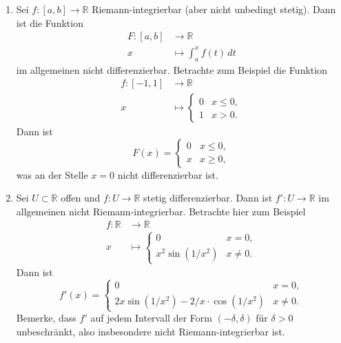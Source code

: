 \documentclass[../main.tex]{subfiles}
\begin{document}
\begin{remarks}
  \leavevmode
  \begin{enumerate}[(1)]
    \item Sei $f \colon [a, b] \to \mathbb{R}$ Riemann-integrierbar
      (aber nicht unbedingt stetig). Dann ist die Funktion
      \begin{align*}
        F \colon [a, b] & \to \mathbb{R} \\
        x & \mapsto \int_{a}^{x} f(t) \, dt
      \end{align*}
      im allgemeinen nicht differenzierbar.
      Betrachte zum Beispiel die Funktion
      \begin{align*}
        f \colon [-1, 1] & \to \mathbb{R} \\
        x & \mapsto 
        \begin{cases}
          0 & x \leq 0,\\
          1 & x > 0.
        \end{cases}
      \end{align*}
      Dann ist
      \[
        F(x) = 
        \begin{cases}
          0 & x \leq 0,\\
          x & x \geq 0,
        \end{cases}
      \]
      was an der Stelle $x = 0$ nicht differenzierbar ist.
    \item Sei $U \subset \mathbb{R}$ offen und
      $f \colon U \to \mathbb{R}$ stetig differenzierbar.
      Dann ist $f' \colon U \to \mathbb{R}$ im allgemeinen
      nicht Riemann-integrierbar.
      Betrachte hier zum Beispiel
      \begin{align*}
        f \colon \mathbb{R} & \to \mathbb{R} \\
        x & \mapsto 
        \begin{cases}
          0 & x = 0, \\
          x^2 \sin(1/x^2) & x \neq 0.
        \end{cases}
      \end{align*}
      Dann ist
      \[
        f'(x) = 
        \begin{cases}
          0 & x = 0,\\
          2x \sin(1/x^2) - 2/x \cdot \cos(1/x^2) & x \neq 0.
        \end{cases}
      \]
      Bemerke, dass $f'$ auf jedem Intervall
      der Form $(-\delta, \delta)$ für $\delta > 0$
      unbeschränkt, also insbesondere
      nicht Riemann-integrierbar ist.
  \end{enumerate}
\end{remarks}
\end{document}
